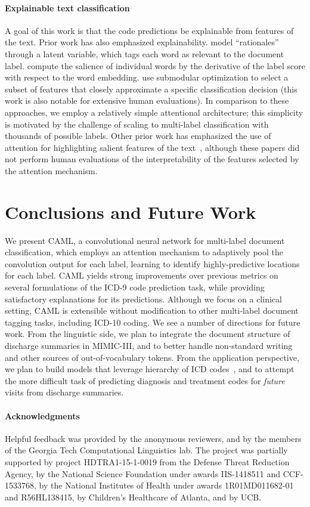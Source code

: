 \documentclass[11pt,a4paper]{article}
\begin{document}
\paragraph{Explainable text classification}
A goal of this work is that the code predictions be explainable from features of the text. Prior work has also emphasized explainability.  model ``rationales'' through a latent variable, which tags each word as relevant to the document label.  compute the salience of individual words by the derivative of the label score with respect to the word embedding.
 use submodular optimization to select a subset of features that closely approximate a specific classification decision (this work is also notable for extensive human evaluations). In comparison to these approaches, we employ a relatively simple attentional architecture; this simplicity is motivated by the challenge of scaling to multi-label classification with thousands of possible labels. Other prior work has emphasized the use of attention for highlighting salient features of the text~\cite[e.g.,][]{rush2015neural,rocktaschel2015reasoning}, although these papers did not perform human evaluations of the interpretability of the features selected by the attention mechanism.
\section{Conclusions and Future Work}
We present CAML, a convolutional neural network for multi-label document classification, which employs an attention mechanism to adaptively pool the convolution output for each label, learning to identify highly-predictive locations for each label. CAML yields strong improvements over previous metrics on several formulations of the ICD-9 code prediction task, while providing satisfactory explanations for its predictions. Although we focus on a clinical setting, CAML is extensible without modification to other multi-label document tagging tasks, including ICD-10 coding. We see a number of directions for future work. From the linguistic side, we plan to integrate the document structure of discharge summaries in MIMIC-III, and to better handle non-standard writing and other sources of out-of-vocabulary tokens. From the application perspective, we plan to build models that leverage hierarchy of ICD codes~\cite{choi2016doctor}, and to attempt the more difficult task of predicting diagnosis and treatment codes for \emph{future} visits from discharge summaries.  

\paragraph{Acknowledgments}
Helpful feedback was provided by the anonymous reviewers, and by the members of the Georgia Tech Computational Linguistics lab. The project was partially supported by project HDTRA1-15-1-0019 from the Defense Threat Reduction Agency, by the National Science Foundation under awards IIS-1418511 and CCF-1533768, by the National Institutes of Health under awards 1R01MD011682-01 and R56HL138415, by Children's Healthcare of Atlanta, and by UCB.



\end{document}
